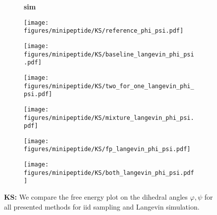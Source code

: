 \begin{figure}
    \begin{minipage}{\textwidth}
        \begin{subfigure}[c]{0.05\textwidth}
            \vspace{-0.2cm}
            \textbf{sim}
        \end{subfigure}
        \begin{subfigure}[c]{0.15\textwidth}
            \centering
            \texttt{[image: figures/minipeptide/KS/reference\_phi\_psi.pdf]}            
        \end{subfigure}
        \begin{subfigure}[c]{0.15\textwidth}
            \centering
            \texttt{[image: figures/minipeptide/KS/baseline\_langevin\_phi\_psi.pdf]}            
        \end{subfigure}
        \begin{subfigure}[c]{0.15\textwidth}
            \centering
            \texttt{[image: figures/minipeptide/KS/two\_for\_one\_langevin\_phi\_psi.pdf]}
        \end{subfigure}
        \begin{subfigure}[c]{0.15\textwidth}
            \centering
            \texttt{[image: figures/minipeptide/KS/mixture\_langevin\_phi\_psi.pdf]}
        \end{subfigure}
        \begin{subfigure}[c]{0.15\textwidth}
            \centering
            \texttt{[image: figures/minipeptide/KS/fp\_langevin\_phi\_psi.pdf]}            
        \end{subfigure}
        \begin{subfigure}[c]{0.15\textwidth}
            \centering
            \texttt{[image: figures/minipeptide/KS/both\_langevin\_phi\_psi.pdf]}            
        \end{subfigure}
    \end{minipage}
    \caption{\textbf{KS:} We compare the free energy plot on the dihedral angles $\varphi, \psi$ for all presented methods for iid sampling and Langevin simulation.}
    \label{fig:minipeptide-ks}
\end{figure}

